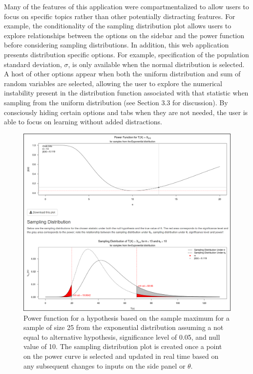 \documentclass{TISE}
\begin{document}
Many of the features of this application were compartmentalized to allow users to focus on specific topics rather than other potentially distracting features. For example, the conditionality of the sampling distribution plot allows users to explore relationships between the options on the sidebar and the power function before considering sampling distributions. In addition, this web application presents distribution specific options. For example, specification of the population standard deviation, $\sigma$, is only available when the normal distribution is selected. A host of other options appear when both the uniform distribution and sum of random variables are selected, allowing the user to explore the numerical instability present in the distribution function associated with that statistic when sampling from the uniform distribution (see Section 3.3 for discussion). By consciously hiding certain options and tabs when they are not needed, the user is able to focus on learning without added distractions. 

\begin{figure}[H]
	\centering
	\includegraphics[scale=1]{fig2.png}
	\caption{Power function for a hypothesis based on the sample maximum for a sample of size 25 from the exponential distribution assuming a not equal to alternative hypothesis, significance level of 0.05, and null value of 10. The sampling distribution plot is created once a point on the power curve is selected and updated in real time based on any subsequent changes to inputs on the side panel or $\theta$.}
\end{figure}
\end{document}
